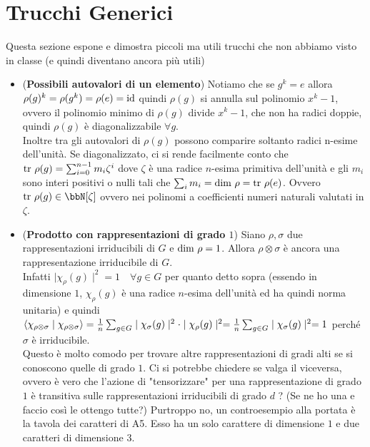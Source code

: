\documentclass[a4paper,NoNotes,GeneralMath]{stdmdoc}
\begin{document}
	\section{Trucchi Generici}
	Questa sezione espone e dimostra piccoli ma utili trucchi che non abbiamo visto in classe (e quindi diventano ancora più utili)
	\begin{itemize}
		\item ({\bf Possibili autovalori di un elemento}) Notiamo che se $g^k = e$ allora $\rho(g)^k = \rho(g^k) = \rho(e) = \mbox{id}$ quindi $\rho(g)$ si annulla sul polinomio $x^k - 1$, ovvero il polinomio minimo di $\rho(g)$ divide $x^k - 1$, che non ha radici doppie, quindi $\rho(g)$ è diagonalizzabile $\forall g$. \\
		Inoltre tra gli autovalori di $\rho(g)$ possono comparire soltanto radici n-esime dell'unità. Se diagonalizzato, ci si rende facilmente conto che $\mbox{tr } \rho(g) = \sum_{i=0}^{n-1} m_i \zeta^i$ dove $\zeta$ è una radice $n$-esima primitiva dell'unità e gli $m_i$ sono interi positivi o nulli tali che $\sum_i m_i = \mbox{dim } \rho = \mbox{tr } \rho (e)$. Ovvero $\Tr \rho (g) \in \bbN[\zeta]$ ovvero nei polinomi a coefficienti numeri naturali valutati in $\zeta$.

		\item ({\bf Prodotto con rappresentazioni di grado $1$}) Siano $\rho, \sigma$ due rappresentazioni irriducibili di $G$ e $\mbox{dim } \rho = 1$. Allora $\rho \otimes \sigma$ è ancora una rappresentazione irriducibile di $G$. \\
		Infatti $\mid \chi_\rho(g) \mid ^ 2 = 1 \quad \forall g \in G$ per quanto detto sopra (essendo in dimensione $1$, $\chi_\rho(g)$ è una radice $n$-esima dell'unità ed ha quindi norma unitaria) e quindi $\langle \chi_{\rho \otimes \sigma} \mid \chi_{\rho \otimes \sigma} \rangle = \frac{1}{n} \sum_{g \in G} \mid \chi_\sigma (g) \mid ^2 \cdot \mid \chi_\rho(g) \mid ^2 = \frac{1}{n} \sum_{g \in G} \mid \chi_\sigma(g) \mid^2 = 1$ perché $\sigma$ è irriducibile. \\
		Questo è molto comodo per trovare altre rappresentazioni di gradi alti se si conoscono quelle di grado $1$. Ci si potrebbe chiedere se valga il viceversa, ovvero è vero che l'azione di "tensorizzare" per una rappresentazione di grado $1$ è transitiva sulle rappresentazioni irriducibili di grado $d$ ? (Se ne ho una e faccio così le ottengo tutte?) Purtroppo no, un controesempio alla portata è la tavola dei caratteri di A5. Esso ha un solo carattere di dimensione $1$ e due caratteri di dimensione $3$.


\end{itemize}
\end{document}

